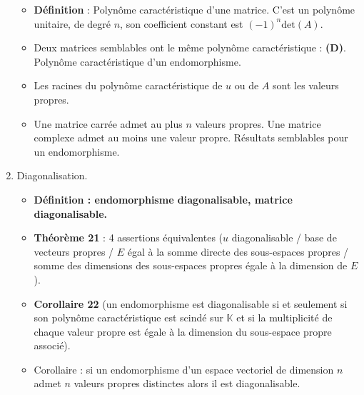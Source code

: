 \documentclass[twoside,a4paper,french,10pt]{VcCours}
\begin{document}
\begin{enumerate}
\begin{itemize}
\item \textbf{Définition} : Polynôme caractéristique d'une matrice. C'est un polynôme unitaire, de degré $n$, son coefficient constant est $(-1)^n \textrm{det}(A)$.
\item Deux matrices semblables ont le même polynôme caractéristique : \textbf{(D)}. Polynôme caractéristique d'un endomorphisme.
\item Les racines du polynôme caractéristique de $u$ ou de $A$ sont les valeurs propres. 
\item Une matrice carrée admet au plus $n$ valeurs propres. Une matrice complexe admet au moins une valeur propre. Résultats semblables pour un endomorphisme. 
\end{itemize}
\item Diagonalisation.
\begin{itemize}
\item \textbf{Définition : endomorphisme diagonalisable, matrice diagonalisable.}
\item \textbf{Théorème 21} : 4 assertions équivalentes ($u$ diagonalisable / base de vecteurs propres / $E$ égal à la somme directe des sous-espaces propres / somme des dimensions des sous-espaces propres égale à la dimension de $E$).
\item \textbf{Corollaire 22} (un endomorphisme est diagonalisable si et seulement si son polynôme caractéristique est scindé sur $\mathbb{K}$ et si la multiplicité de chaque valeur propre est égale à la dimension du sous-espace propre associé).
\item Corollaire : si un endomorphisme d'un espace vectoriel de dimension $n$ admet $n$ valeurs propres distinctes alors il est diagonalisable.
\end{itemize}

\end{enumerate}
\end{document}
